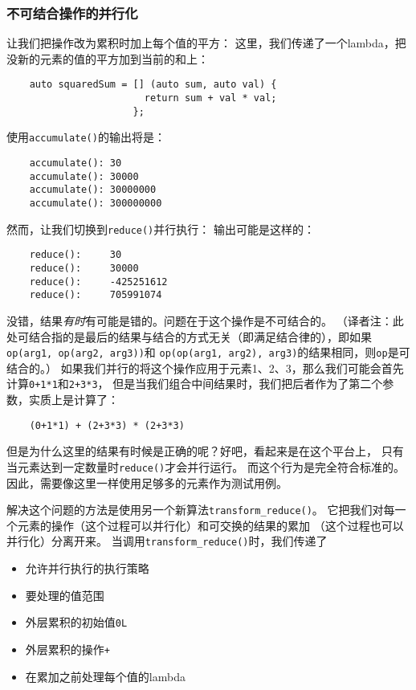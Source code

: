 \subsubsection{不可结合操作的并行化}\label{ch22.6.1.3}
让我们把操作改为累积时加上每个值的平方：
这里，我们传递了一个lambda，把没新的元素的值的平方加到当前的和上：
\begin{lstlisting}
    auto squaredSum = [] (auto sum, auto val) {
                        return sum + val * val;
                      };
\end{lstlisting}
使用\texttt{accumulate()}的输出将是：
\begin{lstlisting}
    accumulate(): 30
    accumulate(): 30000
    accumulate(): 30000000
    accumulate(): 300000000
\end{lstlisting}
然而，让我们切换到\texttt{reduce()}并行执行：
输出可能是这样的：
\begin{lstlisting}
    reduce():     30
    reduce():     30000
    reduce():     -425251612
    reduce():     705991074
\end{lstlisting}
没错，结果\emph{有时}有可能是错的。问题在于这个操作是不可结合的。\label{transform动机}
（译者注：此处可结合指的是最后的结果与结合的方式无关（即满足结合律的），即如果\texttt{op(arg1, op(arg2, arg3))}和
\texttt{op(op(arg1, arg2), arg3)}的结果相同，则\texttt{op}是可结合的。）
如果我们并行的将这个操作应用于元素1、2、3，那么我们可能会首先计算\texttt{0+1*1}和\texttt{2+3*3}，
但是当我们组合中间结果时，我们把后者作为了第二个参数，实质上是计算了：
\begin{lstlisting}
    (0+1*1) + (2+3*3) * (2+3*3)
\end{lstlisting}
但是为什么这里的结果有时候是正确的呢？好吧，看起来是在这个平台上，
只有当元素达到一定数量时\texttt{reduce()}才会并行运行。
而这个行为是完全符合标准的。因此，需要像这里一样使用足够多的元素作为测试用例。

解决这个问题的方法是使用另一个新算法\texttt{transform\_reduce()}。
它把我们对每一个元素的操作（这个过程可以并行化）和可交换的结果的累加
（这个过程也可以并行化）分离开来。
当调用\texttt{transform\_reduce()}时，我们传递了
\begin{itemize}
    \item 允许并行执行的执行策略
    \item 要处理的值范围
    \item 外层累积的初始值\texttt{0L}
    \item 外层累积的操作\texttt{+}
    \item 在累加之前处理每个值的lambda
\end{itemize}

